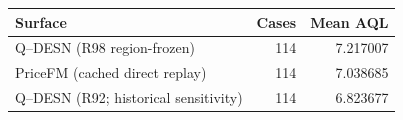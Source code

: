 \begingroup
\TableStyle
\begin{tabular}{@{}lrr@{}}
\toprule
Surface & Cases & Mean AQL \\
\midrule
Q--DESN (R98 region-frozen) & 114 & 7.217007 \\
PriceFM (cached direct replay) & 114 & 7.038685 \\
Q--DESN (R92; historical sensitivity) & 114 & 6.823677 \\
\bottomrule
\end{tabular}
\endgroup
